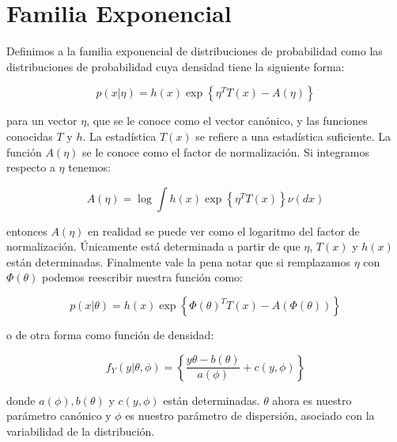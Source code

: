 \section{Familia Exponencial}
\begin{definition} \label{def:fam_exponencial}
Definimos a la familia exponencial de distribuciones de probabilidad como las distribuciones de probabilidad cuya densidad tiene la siguiente forma:

\begin{equation}
    p(x | \eta)=h(x) \exp \left\{\eta^{T} T(x)-A(\eta)\right\}
\end{equation}

para un vector $\eta$, que se le conoce como el vector canónico, y las funciones conocidas $T$ y $h$. La estadística $T(x)$ se refiere a una estadística suficiente. La función $A(\eta)$ se le conoce como el factor de normalización. Si integramos respecto a $\eta$ tenemos:

\begin{equation}
    A(\eta)=\log \int h(x) \exp \left\{\eta^{T} T(x)\right\} \nu(d x)
\end{equation}

entonces $A(\eta)$ en realidad se puede ver como el logaritmo del factor de normalización. Únicamente está determinada a partir de que $\eta$, $T(x)$ y $h(x)$ están determinadas. Finalmente vale la pena notar que si remplazamos $\eta$ con $\Phi(\theta)$ podemos reescribir nuestra función como:

\begin{equation}
    p(x | \theta)=h(x) \exp \left\{\Phi(\theta)^{T} T(x)-A(\Phi(\theta))\right\}
\end{equation}

o de otra forma como función de densidad:

\begin{equation}
    f_{Y}(y | \theta, \phi)=\left\{\frac{y \theta-b(\theta)}{a(\phi)}+c(y, \phi)\right\}
\end{equation}

donde $a(\phi), b(\theta)$ y $c(y,\phi)$ están determinadas. $\theta$ ahora es nuestro parámetro canónico y $\phi$ es nuestro parámetro de dispersión, asociado con la variabilidad de la distribución.

\end{definition}


